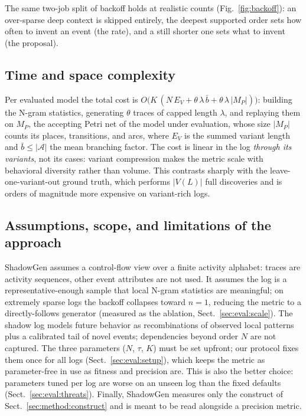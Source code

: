 \documentclass[runningheads]{llncs}
\begin{document}
The same two-job split of backoff holds at realistic counts (Fig.~\ref{fig:backoff}): an over-sparse deep context is skipped entirely, the deepest supported order sets how often to invent an event (the rate), and a still shorter one sets what to invent (the proposal).

\subsection{Time and space complexity}
\label{sec:method:complexity}
Per evaluated model the total cost is $O\!\big(K\,(N\,E_V + \theta\,\lambda\,\bar b + \theta\,\lambda\,|M_P|)\big)$: building the N-gram statistics, generating $\theta$ traces of capped length $\lambda$, and replaying them on $M_P$, the accepting Petri net of the model under evaluation, whose size $|M_P|$ counts its places, transitions, and arcs, where $E_V$ is the summed variant length and $\bar b\le|\mathcal{A}|$ the mean branching factor. The cost is linear in the log \emph{through its variants}, not its cases: variant compression makes the metric scale with behavioral diversity rather than volume. This contrasts sharply with the leave-one-variant-out ground truth, which performs $|V(L)|$ full discoveries and is orders of magnitude more expensive on variant-rich logs.

\subsection{Assumptions, scope, and limitations of the approach}
\label{sec:method:scope}
ShadowGen assumes a control-flow view over a finite activity alphabet: traces are activity sequences, other event attributes are not used. It assumes the log is a representative-enough sample that local N-gram statistics are meaningful; on extremely sparse logs the backoff collapses toward $n{=}1$, reducing the metric to a directly-follows generator (measured as the ablation, Sect.~\ref{sec:eval:scale}). The shadow log models future behavior as recombinations of observed local patterns plus a calibrated tail of novel events; dependencies beyond order $N$ are not captured. The three parameters ($N$, $\tau$, $K$) must be set upfront; our protocol fixes them once for all logs (Sect.~\ref{sec:eval:setup}), which keeps the metric as parameter-free in use as fitness and precision are. This is also the better choice: parameters tuned per log are worse on an unseen log than the fixed defaults (Sect.~\ref{sec:eval:threats}). Finally, ShadowGen measures only the construct of Sect.~\ref{sec:method:construct} and is meant to be read alongside a precision metric.
\end{document}
